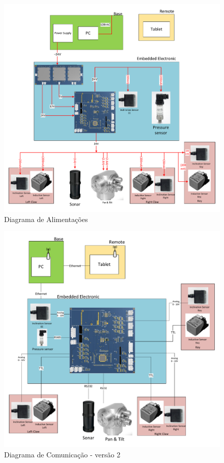 \begin{figure}[H]
\centering
\includegraphics[width=1\columnwidth]{figs/eletronica/alimentacao_placav2.pdf}
\caption{Diagrama de Alimentações}
\label{alimentacao_placav2}
\end{figure}

\begin{figure}[H]
\centering
\includegraphics[width=1\columnwidth]{figs/eletronica/com_placav2.pdf}
\caption{Diagrama de Comunicação - versão 2}
\label{com_placav2}
\end{figure}

